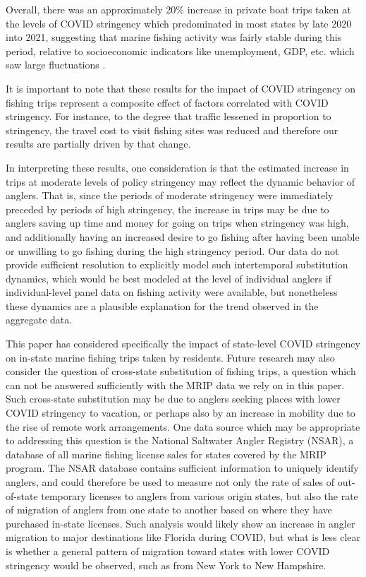 \documentclass[12pt]{article}
\begin{document}
Overall, there was an approximately
20\% increase in private boat trips taken at the levels of COVID
stringency which predominated in most states by late 2020 into 2021,
suggesting that marine fishing activity was fairly stable
during this period, relative to socioeconomic indicators
like unemployment, GDP, etc. which saw large fluctuations \citep{vavra2021Tracking}. 

It is important to note that these results for the impact of COVID
stringency on fishing trips represent a composite effect of factors
correlated with COVID stringency. For instance, to the degree that
traffic lessened in proportion to stringency, the travel cost to visit
fishing sites was reduced and therefore our results are partially driven
by that change.

In interpreting these results, one consideration is that the estimated
increase in trips at moderate levels of policy stringency may reflect
the dynamic behavior of anglers. That is, since the periods of moderate
stringency were immediately preceded by periods of high stringency, the
increase in trips may be due to anglers saving up time and money for
going on trips when stringency was high, and additionally having an
increased desire to go fishing after having been unable or unwilling to
go fishing during the high stringency period. Our data do not provide
sufficient resolution to explicitly model such intertemporal
substitution dynamics, which would be best modeled at the level of
individual anglers if individual-level panel data on fishing activity
were available, but nonetheless these dynamics are a plausible
explanation for the trend observed in the aggregate data.


This paper has considered specifically the impact of state-level COVID
stringency on in-state marine fishing trips taken by residents. Future
research may also consider the question of cross-state substitution of
fishing trips, a question which can not be answered sufficiently with
the MRIP data we rely on in this paper. Such cross-state substitution
may be due to anglers seeking places with lower COVID stringency to
vacation, or perhaps also by an increase in mobility due to the rise of
remote work arrangements. One data source which may be appropriate to
addressing this question is the National Saltwater Angler Registry
(NSAR), a database of all marine fishing license sales for states
covered by the MRIP program. The NSAR database contains sufficient
information to uniquely identify anglers, and could therefore be used to
measure not only the rate of sales of out-of-state temporary licenses to
anglers from various origin states, but also the rate of migration of
anglers from one state to another based on where they have purchased
in-state licenses. Such analysis would likely show an increase in angler
migration to major destinations like Florida during COVID, but what is
less clear is whether a general pattern of migration toward states with
lower COVID stringency would be observed, such as from New York to New
Hampshire.
\end{document}
